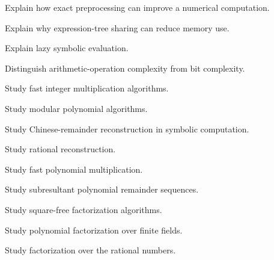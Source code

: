 \begin{exercise}[3]
Explain how exact preprocessing can improve a numerical computation.
\end{exercise}

\begin{exercise}[3]
Explain why expression-tree sharing can reduce memory use.
\end{exercise}

\begin{exercise}[3]
Explain lazy symbolic evaluation.
\end{exercise}

\begin{exercise}[3]
Distinguish arithmetic-operation complexity from bit complexity.
\end{exercise}

\begin{exercise}[4]
Study fast integer multiplication algorithms.
\end{exercise}

\begin{exercise}[4]
Study modular polynomial algorithms.
\end{exercise}

\begin{exercise}[4]
Study Chinese-remainder reconstruction in symbolic computation.
\end{exercise}

\begin{exercise}[4]
Study rational reconstruction.
\end{exercise}

\begin{exercise}[4]
Study fast polynomial multiplication.
\end{exercise}

\begin{exercise}[4]
Study subresultant polynomial remainder sequences.
\end{exercise}

\begin{exercise}[4]
Study square-free factorization algorithms.
\end{exercise}

\begin{exercise}[4]
Study polynomial factorization over finite fields.
\end{exercise}

\begin{exercise}[4]
Study factorization over the rational numbers.
\end{exercise}

